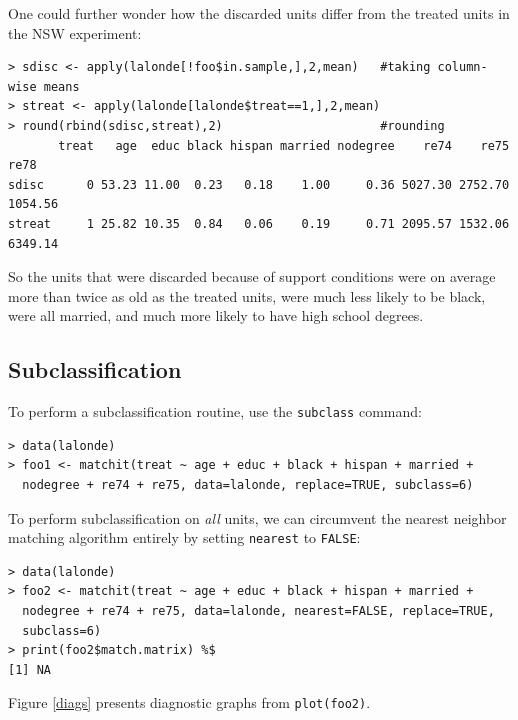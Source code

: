 \documentclass[oneside,letterpaper,titlepage]{article}
\begin{document}
One could further wonder how the discarded units differ from the
treated units in the NSW experiment:

\begin{verbatim}
> sdisc <- apply(lalonde[!foo$in.sample,],2,mean)   #taking column-wise means
> streat <- apply(lalonde[lalonde$treat==1,],2,mean)
> round(rbind(sdisc,streat),2)                      #rounding 
       treat   age  educ black hispan married nodegree    re74    re75    re78
sdisc      0 53.23 11.00  0.23   0.18    1.00     0.36 5027.30 2752.70 1054.56
streat     1 25.82 10.35  0.84   0.06    0.19     0.71 2095.57 1532.06 6349.14
\end{verbatim}

So the units that were discarded because of support conditions were on
average more than twice as old as the treated units, were much less
likely to be black, were all married, and much more likely to have
high school degrees.  

\subsection{Subclassification}

To perform a subclassification routine, use the \texttt{subclass}
command:

\begin{verbatim}
> data(lalonde) 
> foo1 <- matchit(treat ~ age + educ + black + hispan + married +
  nodegree + re74 + re75, data=lalonde, replace=TRUE, subclass=6)
\end{verbatim}

To perform subclassification on \emph{all} units, we can circumvent
the nearest neighbor matching algorithm entirely by setting
\texttt{nearest} to \texttt{FALSE}:

\begin{verbatim}
> data(lalonde) 
> foo2 <- matchit(treat ~ age + educ + black + hispan + married +
  nodegree + re74 + re75, data=lalonde, nearest=FALSE, replace=TRUE,
  subclass=6)
> print(foo2$match.matrix) %$
[1] NA
\end{verbatim}

Figure \ref{diags} presents diagnostic graphs from \texttt{plot(foo2)}.  
\end{document}
